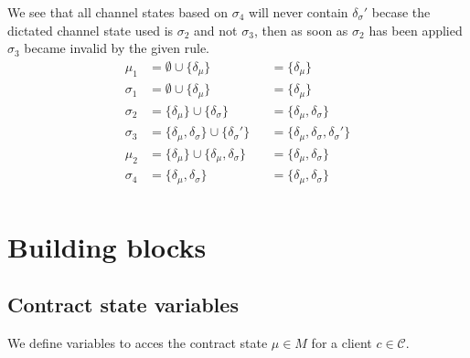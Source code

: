 \documentclass{llncs}
\begin{document}
We see that all channel states based on $\sigma_4$ will never contain $\delta_\sigma'$ becase the dictated channel state used is $\sigma_2$ and not $\sigma_3$, then as soon as $\sigma_2$ has been applied $\sigma_3$ became invalid by the given rule.
\begin{align*}
    \mu_1    &= \emptyset \cup \{\delta_\mu\} & &= \{\delta_\mu\} \\
    \sigma_1 &= \emptyset \cup \{\delta_\mu\} & &= \{\delta_\mu\} \\
    \sigma_2 &= \{\delta_\mu\} \cup \{\delta_\sigma\} & &= \{\delta_\mu,\delta_\sigma\} \\
    \sigma_3 &= \{\delta_\mu,\delta_\sigma\}\cup\{\delta_\sigma'\} & &= \{\delta_\mu,\delta_\sigma,\delta_\sigma'\} \\
    \mu_2    &= \{\delta_\mu\} \cup \{\delta_\mu,\delta_\sigma\} & &= \{\delta_\mu,\delta_\sigma\} \\
    \sigma_4 &=  \{\delta_\mu,\delta_\sigma\} & &= \{\delta_\mu,\delta_\sigma\} \\
\end{align*}

%
%

\section{Building blocks}
\subsection{Contract state variables} We define variables to acces the contract state $\mu \in M$ for a client $c \in \mathcal{C}$.
\end{document}
